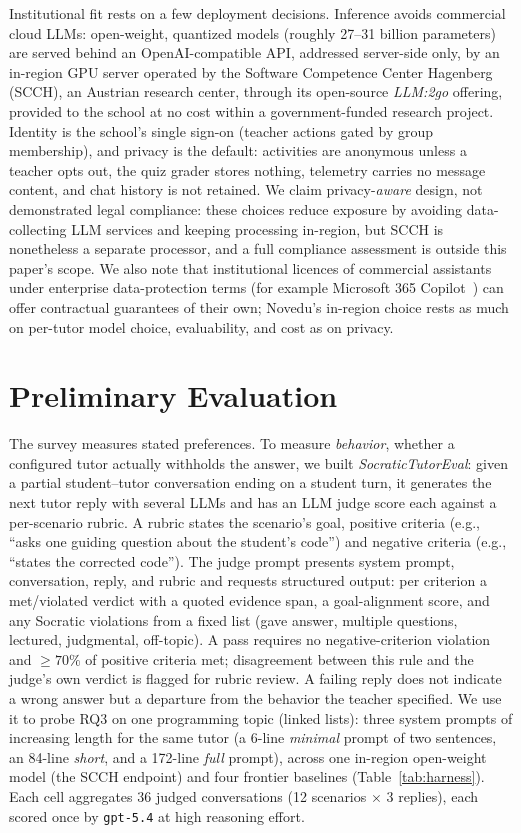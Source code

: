\documentclass[runningheads]{llncs}
\begin{document}
Institutional fit rests on a few deployment decisions. Inference avoids commercial cloud LLMs: open-weight, quantized models (roughly 27--31 billion parameters) are served behind an OpenAI-compatible API, addressed server-side only, by an in-region GPU server operated by the Software Competence Center Hagenberg (SCCH), an Austrian research center, through its open-source \emph{LLM:2go} offering, provided to the school at no cost within a government-funded research project. Identity is the school's single sign-on (teacher actions gated by group membership), and privacy is the default: activities are anonymous unless a teacher opts out, the quiz grader stores nothing, telemetry carries no message content, and chat history is not retained. We claim privacy-\emph{aware} design, not demonstrated legal compliance: these choices reduce exposure by avoiding data-collecting LLM services and keeping processing in-region, but SCCH is nonetheless a separate processor, and a full compliance assessment is outside this paper's scope. We also note that institutional licences of commercial assistants under enterprise data-protection terms (for example Microsoft 365 Copilot~\cite{microsoft2025edp}) can offer contractual guarantees of their own; Novedu's in-region choice rests as much on per-tutor model choice, evaluability, and cost as on privacy.

\section{Preliminary Evaluation}
\label{sec:eval}

The survey measures stated preferences. To measure \emph{behavior}, whether a configured tutor actually withholds the answer, we built \emph{SocraticTutorEval}: given a partial student--tutor conversation ending on a student turn, it generates the next tutor reply with several LLMs and has an LLM judge score each against a per-scenario rubric. A rubric states the scenario's goal, positive criteria (e.g., ``asks one guiding question about the student's code'') and negative criteria (e.g., ``states the corrected code''). The judge prompt presents system prompt, conversation, reply, and rubric and requests structured output: per criterion a met/violated verdict with a quoted evidence span, a goal-alignment score, and any Socratic violations from a fixed list (gave answer, multiple questions, lectured, judgmental, off-topic). A pass requires no negative-criterion violation and $\ge 70\%$ of positive criteria met; disagreement between this rule and the judge's own verdict is flagged for rubric review. A failing reply does not indicate a wrong answer but a departure from the behavior the teacher specified. We use it to probe RQ3 on one programming topic (linked lists): three system prompts of increasing length for the same tutor (a 6-line \emph{minimal} prompt of two sentences, an 84-line \emph{short}, and a 172-line \emph{full} prompt), across one in-region open-weight model (the SCCH endpoint) and four frontier baselines (Table~\ref{tab:harness}). Each cell aggregates $36$ judged conversations (12 scenarios $\times$ 3 replies), each scored once by \texttt{gpt-5.4} at high reasoning effort.
\end{document}
